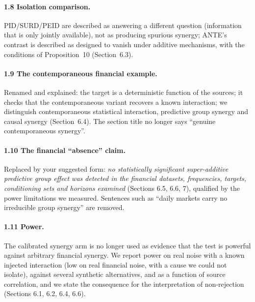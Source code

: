 \documentclass[11pt,a4paper]{article}
\begin{document}
\paragraph{1.8 Isolation comparison.} PID/SURD/PEID are described as answering a different question (information that is only jointly available), not as producing spurious synergy; ANTE's contrast is described as designed to vanish under additive mechanisms, with the conditions of Proposition~10 (Section~6.3).

\paragraph{1.9 The contemporaneous financial example.} Renamed and explained: the target is a deterministic function of the sources; it checks that the contemporaneous variant recovers a known interaction; we distinguish contemporaneous statistical interaction, predictive group synergy and causal synergy (Section~6.4). The section title no longer says ``genuine contemporaneous synergy''.

\paragraph{1.10 The financial ``absence'' claim.} Replaced by your suggested form: \emph{no statistically significant super-additive predictive group effect was detected in the financial datasets, frequencies, targets, conditioning sets and horizons examined} (Sections 6.5, 6.6, 7), qualified by the power limitations we measured. Sentences such as ``daily markets carry no irreducible group synergy'' are removed.

\paragraph{1.11 Power.} The calibrated synergy arm is no longer used as evidence that the test is powerful against arbitrary financial synergy. We report power on real noise with a known injected interaction (low on real financial noise, with a cause we could not isolate), against several synthetic alternatives, and as a function of source correlation, and we state the consequence for the interpretation of non-rejection (Sections 6.1, 6.2, 6.4, 6.6).
\end{document}

